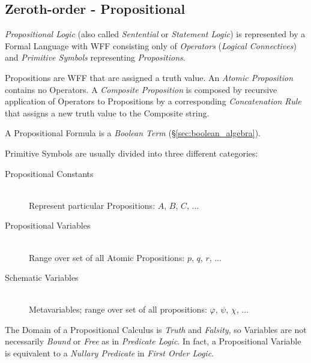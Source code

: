 \subsection{Zeroth-order - Propositional}\label{sec:propositional_logic}

\emph{Propositional Logic} (also called \emph{Sentential} or
\emph{Statement Logic}) is represented by a Formal Language with WFF
consisting only of \emph{Operators} (\emph{Logical Connectives}) and
\emph{Primitive Symbols} representing \emph{Propositions}.

Propositions are WFF that are assigned a truth value. An \emph{Atomic
  Proposition} contains no Operators. A \emph{Composite Proposition}
is composed by recursive application of Operators to Propositions by a
corresponding \emph{Concatenation Rule} that assigns a new truth value
to the Composite string.

A Propositional Formula is a \emph{Boolean Term}
(\S\ref{sec:boolean_algebra}).

Primitive Symbols are usually divided into three different categories:
\begin{description}
\item[Propositional Constants] \hfill \\
Represent particular Propositions: $A$, $B$, $C$, $\ldots$
\item[Propositional Variables] \hfill \\
Range over set of all Atomic Propositions: $p$, $q$, $r$, $\ldots$
\item[Schematic Variables] \hfill \\
Metavariables; range over set of all propositions: $\varphi$, $\psi$,
$\chi$, $\ldots$
\end{description}

The Domain of a Propositional Calculus is \emph{Truth} and
\emph{Falsity}, so Variables are not necessarily \emph{Bound} or
\emph{Free} as in \emph{Predicate Logic}. In fact, a Propositional
Variable is equivalent to a \emph{Nullary Predicate} in \emph{First
  Order Logic}.

